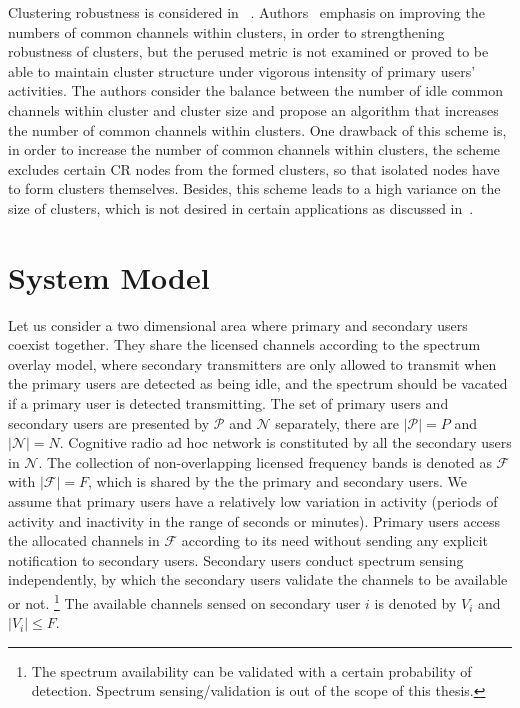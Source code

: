 \documentclass[journal,comsoc]{IEEEtran}
\theoremstyle{mytheoremstyle}
\theoremstyle{mytheoremstyle}
\theoremstyle{mytheoremstyle}
\begin{document}
Clustering robustness is considered in ~\cite{Lazos09, LIU_TMC11_2}.
Authors~\cite{Lazos09, LIU_TMC11_2} emphasis on improving the numbers of common channels within clusters, in order to strengthening robustness of clusters, but the perused metric is not examined or proved to be able to maintain cluster structure under vigorous intensity of primary users’ activities.
The authors consider the balance between the number of idle common channels within cluster and cluster size and propose an algorithm that increases the number of common channels within clusters. 
One drawback of this scheme is, in order to increase the number of common channels within clusters, the scheme excludes certain CR nodes from the formed clusters, so that isolated nodes have to form clusters themselves. 
Besides, this scheme leads to a high variance on the size of clusters, which is not desired in certain applications as discussed in~\cite{clustering_globecom11, cluster_EW10}.



\section{System Model}
\label{sec:model}
Let us consider a two dimensional area where primary and secondary users coexist together.
They share the licensed channels according to the spectrum overlay model, where secondary transmitters are only allowed to transmit when the primary users are detected as being idle, and the spectrum should be vacated if a primary user is detected transmitting.
The set of primary users and secondary users are presented by $\mathcal{P}$ and $\mathcal{N}$ separately, there are $|\mathcal{P}| = P$ and $|\mathcal{N}| = N$.
Cognitive radio ad hoc network is constituted by all the secondary users in $\mathcal{N}$.
The collection of non-overlapping licensed frequency bands is denoted as $\mathcal{F}$ with $|\mathcal{F}| =F$, which is shared by the the primary and secondary users.
We assume that primary users have a relatively low variation in activity (periods of activity and inactivity in the range of seconds or minutes).
%
Primary users access the allocated channels in $\mathcal{F}$ according to its need without sending any explicit notification to secondary users.
Secondary users conduct spectrum sensing independently, by which the secondary users validate the channels to be available or not. \footnote{The spectrum availability can be validated with a certain probability of detection. Spectrum sensing/validation is out of the scope of this thesis.}
The available channels sensed on secondary user $i$ is denoted by $V_i$ and $\vert V_i \vert \leq F$. %
\end{document}

